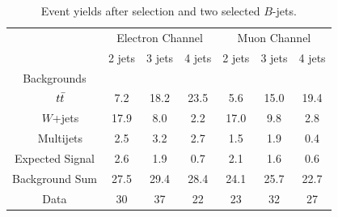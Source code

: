 \begin{table}[!h!tbp]
\begin{center}
\caption{Event yields after selection and two selected $B$-jets.}
\label{twotag-yields}
\begin{tabular}{c|ccc|ccc}
& \multicolumn{3}{c|}{Electron Channel} & \multicolumn{3}{c}{Muon Channel} \\
                         & 2 jets & 3 jets & 4 jets
                         & 2 jets & 3 jets & 4 jets	\\
\hline
Backgrounds            	&		&      		&       	&       	&       	&       	\\
~~$\mbox{$t\bar{t}$}$			&	7.2	&	18.2	&	23.5	&	5.6	&	15.0	&	19.4	\\
~~$W$+jets		&	17.9	&	8.0	&	2.2	&	17.0	&	9.8	&	2.8	\\
~~Multijets              	&  	2.5 	&   3.2 	&   2.7 	& 1.5 	&   1.9 	&   0.4	\\
\hline                                                                                       
Expected Signal	& 	2.6	&	1.9	&	0.7	&	2.1	&	1.6	& 0.6		\\
Background Sum   	&	27.5	&	29.4 	&	28.4	&	24.1	&  25.7 	&  22.7	\\
\hline                                                                                       
Data                     	&	30	&   37  	&   22  	&	23  	&   32  	&   27  
\end{tabular}
\vspace{-0.1in}
\end{center}
\end{table}

